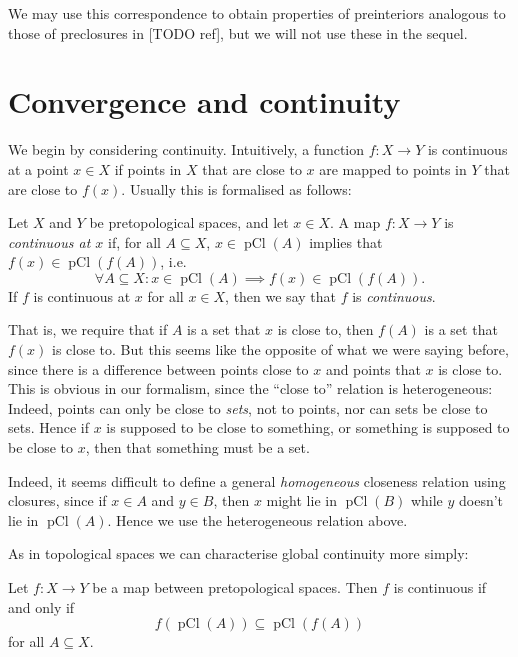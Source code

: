 \documentclass[article, a4paper, 11pt, oneside]{memoir}
\numberwithin{equation}{chapter}
\newcommand{\pCl}[1]{\operatorname{pCl}(#1)}
\begin{document}
We may use this correspondence to obtain properties of preinteriors analogous to those of preclosures in [TODO ref], but we will not use these in the sequel.




\section{Convergence and continuity}

We begin by considering continuity. Intuitively, a function $f \colon X \to Y$ is continuous at a point $x \in X$ if points in $X$ that are close to $x$ are mapped to points in $Y$ that are close to $f(x)$. Usually this is formalised as follows:

\begin{definition}[Continuity]
    Let $X$ and $Y$ be pretopological spaces, and let $x \in X$. A map $f \colon X \to Y$ is \emph{continuous at $x$} if, for all $A \subseteq X$, $x \in \pCl{A}$ implies that $f(x) \in \pCl{f(A)}$, i.e.
    \begin{equation*}
        \forall A \subseteq X \colon x \in \pCl{A} \implies f(x) \in \pCl{f(A)}.
    \end{equation*}
    If $f$ is continuous at $x$ for all $x \in X$, then we say that $f$ is \emph{continuous}.
\end{definition}
%
That is, we require that if $A$ is a set that $x$ is close to, then $f(A)$ is a set that $f(x)$ is close to. But this seems like the opposite of what we were saying before, since there is a difference between points close to $x$ and points that $x$ is close to. This is obvious in our formalism, since the \enquote{close to} relation is heterogeneous: Indeed, points can only be close to \emph{sets}, not to points, nor can sets be close to sets. Hence if $x$ is supposed to be close to something, or something is supposed to be close to $x$, then that something must be a set.

Indeed, it seems difficult to define a general \emph{homogeneous} closeness relation using closures, since if $x \in A$ and $y \in B$, then $x$ might lie in $\pCl{B}$ while $y$ doesn't lie in $\pCl{A}$. Hence we use the heterogeneous relation above.

As in topological spaces we can characterise global continuity more simply:

\begin{proposition}
    Let $f \colon X \to Y$ be a map between pretopological spaces. Then $f$ is continuous if and only if
    \begin{equation*}
        f(\pCl{A})
            \subseteq \pCl{f(A)}
    \end{equation*}
    for all $A \subseteq X$.
\end{proposition}
\end{document}
